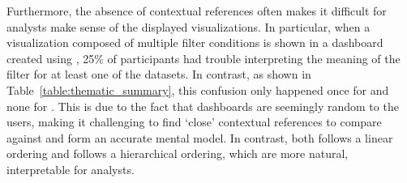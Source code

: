 \par Furthermore, the absence of contextual references often makes it difficult for analysts make sense of the displayed visualizations. In particular, when a visualization composed of multiple filter conditions is shown in a dashboard created using \cluster, 25\% of participants had trouble interpreting the meaning of the filter for at least one of the datasets. In contrast, as shown in Table~\ref{table:thematic_summary}, this confusion only happened once for \BFS and none for \system. This is due to the fact that \cluster dashboards are seemingly random to the users, making it challenging to find `close' contextual references to compare against and form an accurate mental model. In contrast, both \BFS follows a linear ordering and \system follows a hierarchical ordering, which are more natural, interpretable for analysts. 

